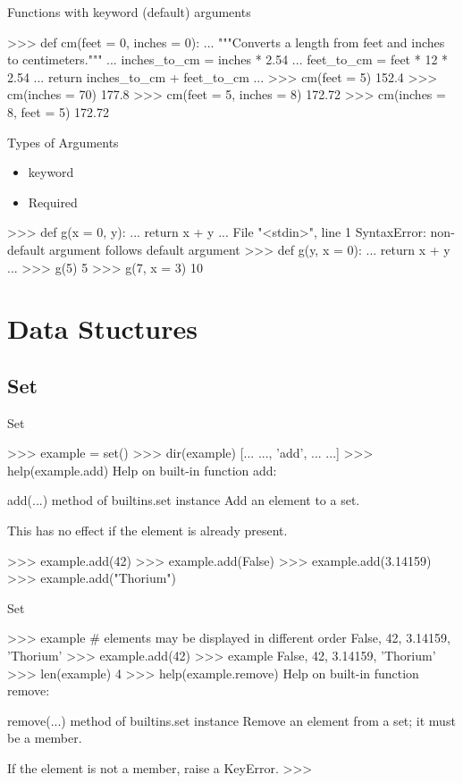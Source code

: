 \documentclass{beamer}
\begin{document}
\begin{frame}[fragile]{Functions with keyword (default) arguments}
\begin{pythoncode}
>>> def cm(feet = 0, inches = 0):
...     """Converts a length from feet and inches to centimeters."""
...     inches_to_cm = inches * 2.54
...     feet_to_cm = feet * 12 * 2.54
...     return inches_to_cm + feet_to_cm
...
>>> cm(feet = 5)
152.4
>>> cm(inches = 70)
177.8
>>> cm(feet = 5, inches = 8)
172.72
>>> cm(inches = 8, feet = 5)
172.72
\end{pythoncode}
\end{frame}

\begin{frame}[fragile]{Types of Arguments}
\begin{itemize}
  \item keyword
  \item Required
\end{itemize}
\begin{pythoncode}
>>> def g(x = 0, y):
...     return x + y
...
  File "<stdin>", line 1
SyntaxError: non-default argument follows default argument
>>> def g(y, x = 0):
...     return x + y
...
>>> g(5)
5
>>> g(7, x = 3)
10
\end{pythoncode}
\end{frame}

\section{Data Stuctures}
\subsection{Set}

\begin{frame}[fragile]{Set}
\begin{pythoncode}
>>> example = set()
>>> dir(example)
[... ..., 'add', ... ...]
>>> help(example.add)
Help on built-in function add:

add(...) method of builtins.set instance
    Add an element to a set.

    This has no effect if the element is already present.

>>> example.add(42)
>>> example.add(False)
>>> example.add(3.14159)
>>> example.add("Thorium")
\end{pythoncode}
\end{frame}

\begin{frame}[fragile]{Set}
\begin{pythoncode}
>>> example  # elements may be displayed in different order
{False, 42, 3.14159, 'Thorium'}
>>> example.add(42)
>>> example
{False, 42, 3.14159, 'Thorium'}
>>> len(example)
4
>>> help(example.remove)
Help on built-in function remove:

remove(...) method of builtins.set instance
    Remove an element from a set; it must be a member.

    If the element is not a member, raise a KeyError.
>>>
\end{pythoncode}
\end{frame}
\end{document}
